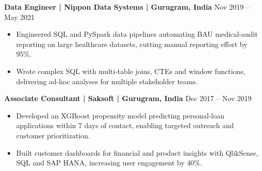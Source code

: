 \documentclass[10pt,a4paper]{article}
\newcommand{\role}[2]{\textbf{#1} \hfill #2\par}
\begin{document}
\role{Data Engineer | Nippon Data Systems | Gurugram, India}{Nov 2019 -- May 2021}
\begin{itemize}
  \item Engineered SQL and PySpark data pipelines automating BAU medical-audit reporting on large healthcare datasets,
  cutting manual reporting effort by 95\%.
  \item Wrote complex SQL with multi-table joins, CTEs and window functions, delivering ad-hoc analyses for multiple
  stakeholder teams.
\end{itemize}
\vspace{3pt}

\role{Associate Consultant | Saksoft | Gurugram, India}{Dec 2017 -- Nov 2019}
\begin{itemize}
  \item Developed an XGBoost propensity model predicting personal-loan applications within 7 days of contact,
  enabling targeted outreach and customer prioritization.
  \item Built customer dashboards for financial and product insights with QlikSense, SQL and SAP HANA, increasing
  user engagement by 40\%.
\end{itemize}
\end{document}
